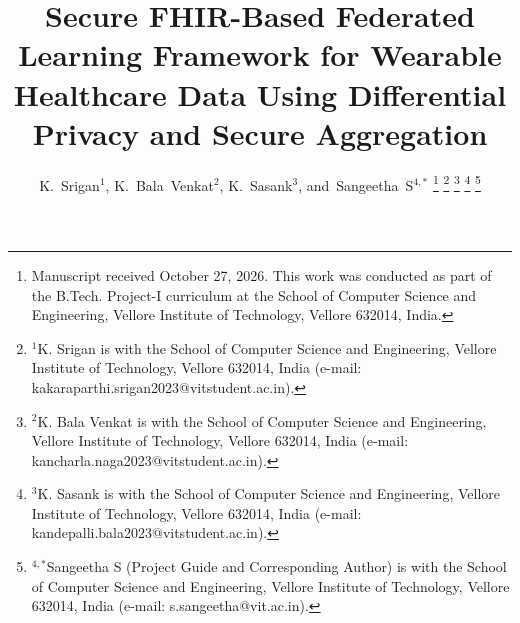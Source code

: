 \documentclass[journal,twocolumn,10pt]{IEEEtran}
\begin{document}
\title{Secure FHIR-Based Federated Learning Framework for Wearable Healthcare Data Using Differential Privacy and Secure Aggregation}

\author{
  K.~Srigan$^{1}$, 
  K.~Bala~Venkat$^{2}$, 
  K.~Sasank$^{3}$, 
  and~Sangeetha~S$^{4,*}$%
  \thanks{Manuscript received October 27, 2026. This work was conducted as part of the B.Tech. Project-I curriculum at the School of Computer Science and Engineering, Vellore Institute of Technology, Vellore 632014, India.}%
  \thanks{$^{1}$K. Srigan is with the School of Computer Science and Engineering, Vellore Institute of Technology, Vellore 632014, India (e-mail: kakaraparthi.srigan2023@vitstudent.ac.in).}%
  \thanks{$^{2}$K. Bala Venkat is with the School of Computer Science and Engineering, Vellore Institute of Technology, Vellore 632014, India (e-mail: kancharla.naga2023@vitstudent.ac.in).}%
  \thanks{$^{3}$K. Sasank is with the School of Computer Science and Engineering, Vellore Institute of Technology, Vellore 632014, India (e-mail: kandepalli.bala2023@vitstudent.ac.in).}%
  \thanks{$^{4,*}$Sangeetha S (Project Guide and Corresponding Author) is with the School of Computer Science and Engineering, Vellore Institute of Technology, Vellore 632014, India (e-mail: s.sangeetha@vit.ac.in).}
}

\maketitle
\end{document}
